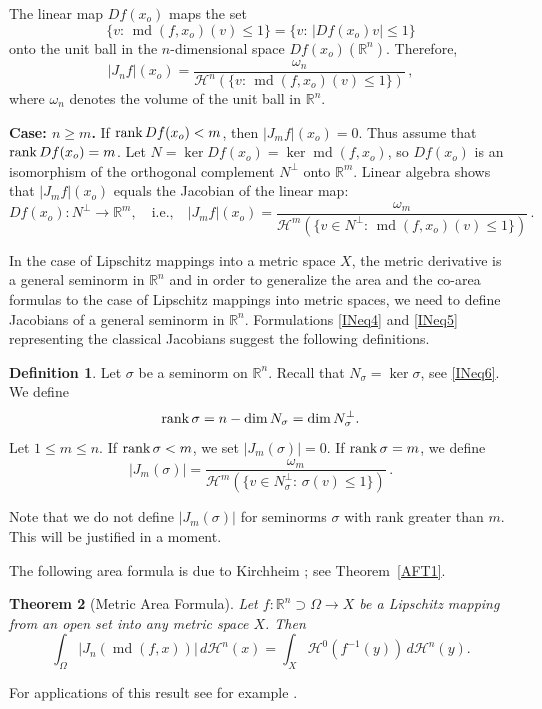 \documentclass[12pt,leqno]{amsart}
\newtheorem{theorem}{Theorem}
\theoremstyle{definition}
\newtheorem{definition}[theorem]{Definition}
\newcommand{\bbbr}{\mathbb R}
\def\H{{\mathcal H}}
\def\rank{{\rm rank\,}}
\def\md{\operatorname{md}}
\numberwithin{theorem}{section} \numberwithin{equation}{section}
\begin{document}
The linear map $Df(x_o)$ maps the set
$$
\{v:\, \md(f,x_o)(v)\leq 1\}=\{v:\, |Df(x_o)v|\leq 1\}
$$
onto the unit ball in the $n$-dimensional space $Df(x_o)(\bbbr^n)$. Therefore,
\begin{equation}
\label{INeq4}
|J_n f|(x_o)=\frac{\omega_n}{\H^n(\{v:\, \md(f,x_o)(v)\leq 1\})}\, ,
\end{equation}
where $\omega_n$ denotes the volume of the unit ball in $\bbbr^n$.

{\bf Case: $n\geq m$.} If $\rank Df(x_o)<m$, then $|J_m f|(x_o)=0$. Thus assume that $\rank Df(x_o)=m$.
Let
$N=\ker Df(x_o)=\ker \md(f,x_o)$, so
$Df(x_o)$ is an isomorphism of the orthogonal complement $N^\perp$ onto $\bbbr^m$.
Linear algebra shows that $|J_m f|(x_o)$ equals the Jacobian of the linear map:
\begin{equation}
\label{INeq5}
Df(x_o):N^\perp\to\bbbr^m,
\quad
\text{i.e.,}
\quad
|J_m f|(x_o)=\frac{\omega_m}{\H^m(\{v\in N^\perp:\, \md(f,x_o)(v)\leq 1\})}\, .
\end{equation}

In the case of Lipschitz mappings into a metric space $X$, the metric derivative is a general seminorm in $\bbbr^n$ and in order to generalize the area and the co-area formulas to the case of Lipschitz mappings into metric spaces, we need to define Jacobians of a general seminorm in $\bbbr^n$. Formulations \eqref{INeq4} and \eqref{INeq5} representing the classical Jacobians suggest the following definitions.

\begin{definition}
\label{INd2}
Let $\sigma$ be a seminorm on $\bbbr^n$. Recall that $N_\sigma=\ker\sigma$, see \eqref{INeq6}. We define
$$
\rank\sigma=n-\dim N_\sigma=\dim N_\sigma^\perp.
$$
Let $1\leq m\leq n$. If $\rank\sigma<m$, we set $|J_m(\sigma)|=0$. If $\rank\sigma=m$, we define
$$
|J_m(\sigma)|=\frac{\omega_m}{\H^m(\{v\in N_\sigma^\perp:\, \sigma(v)\leq 1\})}\, .
$$
\end{definition}
Note that we do not define $|J_m(\sigma)|$ for seminorms $\sigma$ with rank greater than $m$. This will be justified in a moment.

The following area formula is due to Kirchheim \cite[Theorem~7]{kir}; see Theorem~\ref{AFT1}.
\begin{theorem}[Metric Area Formula]
\label{INT4}
Let $f:\bbbr^n\supset\Omega\to X$ be a Lipschitz mapping from an open set into any metric space $X$. Then
$$
\int_\Omega|J_n(\md(f,x))|\, d\H^n(x)=\int_X \H^0(f^{-1}(y))\, d\H^n(y).
$$
\end{theorem}
For applications of this result see for example \cite{ambkir2,ambkir,DV,EH2,lytchakw,wenger,wengery}.
\end{document}
